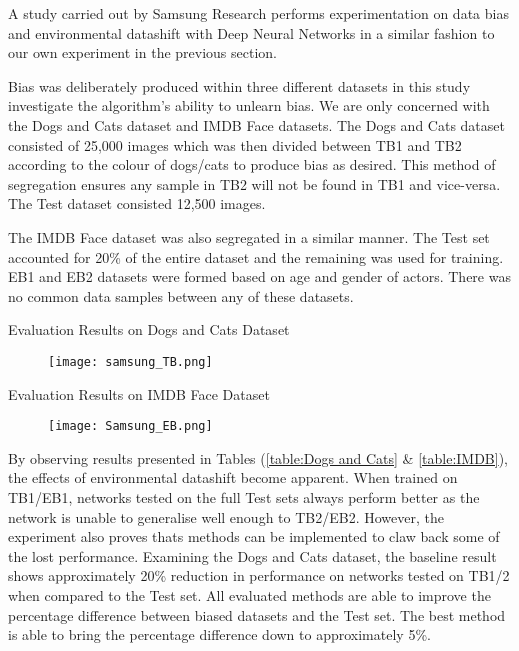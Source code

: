 \bigskip
A study carried out by Samsung Research \cite{8953715} performs experimentation on data bias and environmental datashift with Deep Neural Networks in a similar fashion to our own experiment in the previous section.

Bias was deliberately produced within three different datasets in this study investigate the algorithm's ability to unlearn bias. 
We are only concerned with the Dogs and Cats dataset and IMDB Face datasets.
The Dogs and Cats dataset consisted of 25,000 images which was then divided between TB1 and TB2 according to the colour of dogs/cats to produce bias as desired.
This method of segregation ensures any sample in TB2 will not be found in TB1 and vice-versa.
The Test dataset consisted 12,500 images. 

The IMDB Face dataset was also segregated in a similar manner.
The Test set accounted for 20\% of the entire dataset and the remaining was used for training.
EB1 and EB2 datasets were formed based on age and gender of actors. There was no common data samples between any of these datasets.

\begin{table}[H]
    \caption{Evaluation Results on Dogs and Cats Dataset \cite{8953715}}
    \begin{figure}[H]
        \texttt{[image: samsung\_TB.png]}
        \centering
    \end{figure}
    \label{table:Dogs and Cats}
\end{table}

\begin{table}[H]
    \caption{Evaluation Results on IMDB Face Dataset \cite{8953715}}
    \begin{figure}[H]
        \texttt{[image: Samsung\_EB.png]}
        \centering
    \end{figure}
    \label{table:IMDB}
\end{table}

By observing results presented in Tables (\ref{table:Dogs and Cats} \& \ref{table:IMDB}), the effects of environmental datashift become apparent.
When trained on TB1/EB1, networks tested on the full Test sets always perform better as the network is unable to generalise well enough to TB2/EB2.
However, the experiment also proves thats methods can be implemented to claw back some of the lost performance. 
Examining the Dogs and Cats dataset, the baseline result shows approximately 20\% reduction in performance on networks tested on TB1/2 when compared to the Test set.
All evaluated methods are able to improve the percentage difference between biased datasets and the Test set. 
The best method is able to bring the percentage difference down to approximately 5\%.

